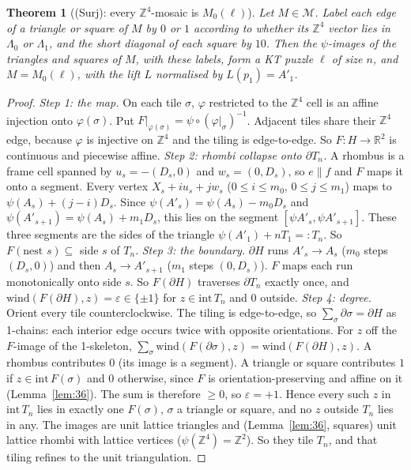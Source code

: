 \documentclass[11pt]{article}
\newtheorem{theorem}{Theorem}\newtheorem{lemma}[theorem]{Lemma}\newtheorem{proposition}[theorem]{Proposition}
\theoremstyle{definition}\newtheorem{definition}[theorem]{Definition}\newtheorem{remark}[theorem]{Remark}
\newcommand{\Z}{\mathbb Z}\newcommand{\R}{\mathbb R}
\newcommand{\M}{\mathcal M}\newcommand{\F}{\mathcal F}
\begin{document}
\begin{theorem}[(Surj): every $\Z^4$-mosaic is $M_0(\ell)$]\label{thm:S}
Let $M\in\M$. Label each edge of a triangle or square of $M$ by $0$ or $1$ according to whether its $\Z^4$ vector lies in $\Lambda_0$ or $\Lambda_1$, and the short diagonal of each square by $10$. Then the $\psi$-images of the triangles and squares of $M$, with these labels, form a KT puzzle $\ell$ of size $n$, and $M=M_0(\ell)$, with the lift $L$ normalised by $L(p_1)=A'_1$.
\end{theorem}
\begin{proof}
\emph{Step 1: the map.} On each tile $\sigma$, $\varphi$ restricted to the $\Z^4$ cell is an affine injection onto $\varphi(\sigma)$. Put $F|_{\varphi(\sigma)}=\psi\circ(\varphi|_\sigma)^{-1}$. Adjacent tiles share their $\Z^4$ edge, because $\varphi$ is injective on $\Z^4$ and the tiling is edge-to-edge. So $F:H\to\R^2$ is continuous and piecewise affine.
\emph{Step 2: rhombi collapse onto $\partial T_n$.} A rhombus is a frame cell spanned by $u_s=-(D_s,0)$ and $w_s=(0,D_s)$, so $e\parallel f$ and $F$ maps it onto a segment. Every vertex $X_s+iu_s+jw_s$ ($0\le i\le m_0$, $0\le j\le m_1$) maps to $\psi(A_s)+(j-i)D_s$. Since $\psi(A'_s)=\psi(A_s)-m_0D_s$ and $\psi(A'_{s+1})=\psi(A_s)+m_1D_s$, this lies on the segment $[\psi A'_s,\psi A'_{s+1}]$. These three segments are the sides of the triangle $\psi(A'_1)+nT_1=:T_n$. So $F(\text{nest }s)\subseteq$ side $s$ of $T_n$.
\emph{Step 3: the boundary.} $\partial H$ runs $A'_s\to A_s$ ($m_0$ steps $(D_s,0)$) and then $A_s\to A'_{s+1}$ ($m_1$ steps $(0,D_s)$). $F$ maps each run monotonically onto side $s$. So $F(\partial H)$ traverses $\partial T_n$ exactly once, and $\mathrm{wind}(F(\partial H),z)=\varepsilon\in\{\pm1\}$ for $z\in\mathrm{int}\,T_n$ and $0$ outside.
\emph{Step 4: degree.} Orient every tile counterclockwise. The tiling is edge-to-edge, so $\sum_\sigma\partial\sigma=\partial H$ as 1-chains: each interior edge occurs twice with opposite orientations. For $z$ off the $F$-image of the 1-skeleton, $\sum_\sigma\mathrm{wind}(F(\partial\sigma),z)=\mathrm{wind}(F(\partial H),z)$. A rhombus contributes $0$ (its image is a segment). A triangle or square contributes $1$ if $z\in\mathrm{int}\,F(\sigma)$ and $0$ otherwise, since $F$ is orientation-preserving and affine on it (Lemma~\ref{lem:36}). The sum is therefore $\ge0$, so $\varepsilon=+1$. Hence every such $z$ in $\mathrm{int}\,T_n$ lies in exactly one $F(\sigma)$, $\sigma$ a triangle or square, and no $z$ outside $T_n$ lies in any. The images are unit lattice triangles and (Lemma~\ref{lem:36}, squares) unit lattice rhombi with lattice vertices ($\psi(\Z^4)=\Z^2$). So they tile $T_n$, and that tiling refines to the unit triangulation.

\end{proof}
\end{document}

